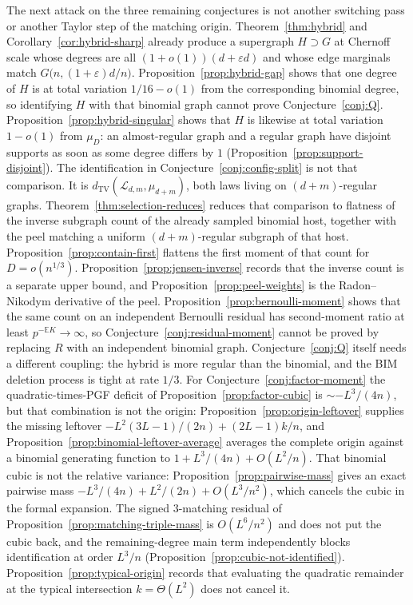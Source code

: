 \documentclass[11pt]{article}
\newcommand{\EE}{\mathbb{E}}
\newcommand{\dTV}{d_{\mathrm{TV}}}
\begin{document}
The next attack on the three remaining conjectures is not another switching pass or another Taylor step of the matching origin.
Theorem~\ref{thm:hybrid} and Corollary~\ref{cor:hybrid-sharp} already produce a supergraph \(H\supset G\) at Chernoff scale whose degrees are all \((1+o(1))(d+\varepsilon d)\) and whose edge marginals match \(G\bigl(n,(1+\varepsilon)d/n\bigr)\).
Proposition~\ref{prop:hybrid-gap} shows that one degree of \(H\) is at total variation \(1/16-o(1)\) from the corresponding binomial degree, so identifying \(H\) with that binomial graph cannot prove Conjecture~\ref{conj:Q}.
Proposition~\ref{prop:hybrid-singular} shows that \(H\) is likewise at total variation \(1-o(1)\) from \(\mu_D\): an almost-regular graph and a regular graph have disjoint supports as soon as some degree differs by \(1\) (Proposition~\ref{prop:support-disjoint}).
The identification in Conjecture~\ref{conj:config-split} is not that comparison.
It is \(\dTV(\mathcal{L}_{d,m},\mu_{d+m})\), both laws living on \((d+m)\)-regular graphs.
Theorem~\ref{thm:selection-reduces} reduces that comparison to flatness of the inverse subgraph count of the already sampled binomial host, together with the peel matching a uniform \((d+m)\)-regular subgraph of that host.
Proposition~\ref{prop:contain-first} flattens the first moment of that count for \(D=o(n^{1/3})\).
Proposition~\ref{prop:jensen-inverse} records that the inverse count is a separate upper bound, and Proposition~\ref{prop:peel-weights} is the Radon--Nikodym derivative of the peel.
Proposition~\ref{prop:bernoulli-moment} shows that the same count on an independent Bernoulli residual has second-moment ratio at least \(p^{-\EE K}\to\infty\), so Conjecture~\ref{conj:residual-moment} cannot be proved by replacing \(R\) with an independent binomial graph.
Conjecture~\ref{conj:Q} itself needs a different coupling: the hybrid is more regular than the binomial, and the BIM deletion process is tight at rate \(1/3\).
For Conjecture~\ref{conj:factor-moment} the quadratic-times-PGF deficit of Proposition~\ref{prop:factor-cubic} is \(\sim-L^3/(4n)\), but that combination is not the origin: Proposition~\ref{prop:origin-leftover} supplies the missing leftover \(-L^2(3L-1)/(2n)+(2L-1)k/n\), and Proposition~\ref{prop:binomial-leftover-average} averages the complete origin against a binomial generating function to \(1+L^3/(4n)+O(L^2/n)\).
That binomial cubic is not the relative variance: Proposition~\ref{prop:pairwise-mass} gives an exact pairwise mass \(-L^3/(4n)+L^2/(2n)+O(L^3/n^2)\), which cancels the cubic in the formal expansion.
The signed \(3\)-matching residual of Proposition~\ref{prop:matching-triple-mass} is \(O(L^6/n^2)\) and does not put the cubic back, and the remaining-degree main term independently blocks identification at order \(L^3/n\) (Proposition~\ref{prop:cubic-not-identified}).
Proposition~\ref{prop:typical-origin} records that evaluating the quadratic remainder at the typical intersection \(k=\Theta(L^2)\) does not cancel it.
\end{document}
